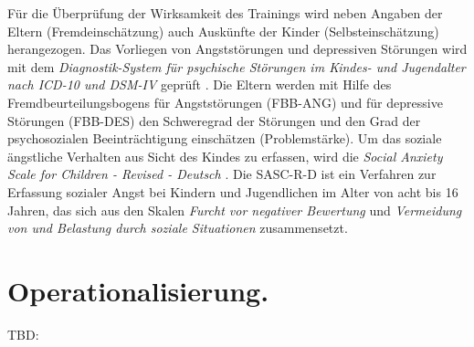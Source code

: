 Für die Überprüfung der Wirksamkeit des Trainings wird neben Angaben der Eltern (Fremdeinschätzung) auch Auskünfte der Kinder (Selbsteinschätzung) herangezogen. Das Vorliegen von Angststörungen und depressiven Störungen wird mit dem \textit{Diagnostik-System für psychische Störungen im Kindes- und Jugendalter nach ICD-10 und DSM-IV} geprüft \cite<DISYPS-KJ>{Doepfner:2003}. Die Eltern werden mit Hilfe des Fremdbeurteilungsbogens für Angststörungen (FBB-ANG) und für depressive Störungen (FBB-DES) den Schweregrad der Störungen und den Grad der psychosozialen Beeinträchtigung einschätzen (Problemstärke). Um das soziale ängstliche Verhalten aus Sicht des Kindes zu erfassen, wird die \textit{Social Anxiety Scale for Children - Revised - Deutsch} \cite<SASC-R-D>{Melfsen:1999}. Die SASC-R-D ist ein Verfahren zur Erfassung sozialer Angst bei Kindern und Jugendlichen im Alter von acht bis 16 Jahren, das sich aus den Skalen \textit{Furcht vor negativer Bewertung} und \textit{Vermeidung von und Belastung durch soziale Situationen} zusammensetzt.

\section{Operationalisierung.} TBD: 

